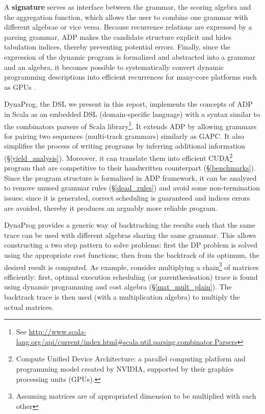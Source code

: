 A \textbf{signature} serves as interface between the grammar, the scoring algebra and the aggregation function, which allows the user to combine one grammar with different algebrae or vice versa. Because recurrence relations are expressed by a parsing grammar, ADP makes the candidate structure explicit and hides tabulation indices, thereby preventing potential errors. Finally, since the expression of the dynamic program is formalized and abstracted into a grammar and an algebra, it becomes possible to systematically convert dynamic programming descriptions into efficient recurrences for many-core platforms such as GPUs \cite{adp_gpu}.

DynaProg, the DSL we present in this report, implements the concepts of ADP in Scala as an embedded DSL (domain-specific language) with a syntax similar to the combinators parsers of Scala library\footnote{See \url{http://www.scala-lang.org/api/current/index.html\#scala.util.parsing.combinator.Parsers}}. It extends ADP by allowing grammars for pairing two sequences (multi-track grammars) similarly as GAPC\cite{gapc_thesis}. It also simplifies the process of writing programs by inferring additional information (\S\ref{yield_analysis}). Moreover, it can translate them into efficient CUDA\footnote{Compute Unified Device Architecture: a parallel computing platform and programming model created by NVIDIA, supported by their graphics processing units (GPUs).} program that are competitive to their handwritten counterpart (\S\ref{benchmarks}). Since the program structure is formalized in ADP framework, it can be analyzed to remove unused grammar rules (\S\ref{dead_rules}) and avoid some non-termination issues; since it is generated, correct scheduling is guaranteed and indices errors are avoided, thereby it produces an arguably more reliable program.

DynaProg provides a generic way of backtracking the results such that the same trace can be used with different algebras sharing the same grammar. This allows constructing a two step pattern to solve problems: first the DP problem is solved using the appropriate cost functions; then from the backtrack of its optimum, the desired result is computed. As example, consider multiplying a chain\footnote{Assuming matrices are of appropriated dimension to be multiplied with each other} of matrices efficiently: first, optimal execution scheduling (or parenthesisation) trace is found using dynamic programming and cost algebra (\S\ref{mat_mult_plain}). The backtrack trace is then used (with a multiplication algebra) to multiply the actual matrices.


